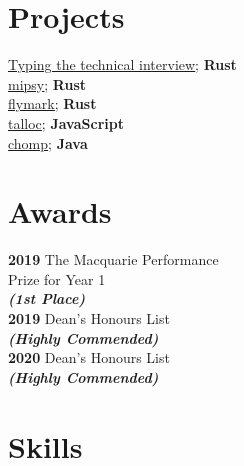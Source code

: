 \documentclass[a4paper]{deedy-resume}
\begin{document}
\begin{minipage}[t]{0.33\textwidth}
\sectionspace


\section{Projects}

\href{https://github.com/insou22/typing-the-technical-interview-rust}
	{\underline{Typing the technical interview}}; \textbf{Rust} \\
\href{https://github.com/insou22/mipsy}
	{\underline{mipsy}}; \textbf{ Rust} \\
\href{https://github.com/insou22/flymark}
	{\underline{flymark}}; \textbf{ Rust} \\
\href{https://cgi.cse.unsw.edu.au/~talloc/}
	{\underline{talloc}}; \textbf{ JavaScript} \\
\href{https://github.com/insou22/chomp}
	{\underline{chomp}}; \textbf{ Java} \\

\sectionspace


\section{Awards}

\textbf{2019}
The Macquarie Performance \\
Prize for Year 1 \\
{\footnotesize \textit{\textbf{(1st Place) }}} \\

\textbf{2019}
Dean's Honours List \\
{\footnotesize \textit{\textbf{(Highly Commended) }}} \\

\textbf{2020}
Dean's Honours List \\
{\footnotesize \textit{\textbf{(Highly Commended) }}} \\

\sectionspace


\section{Skills}


\end{minipage}
\end{document}
